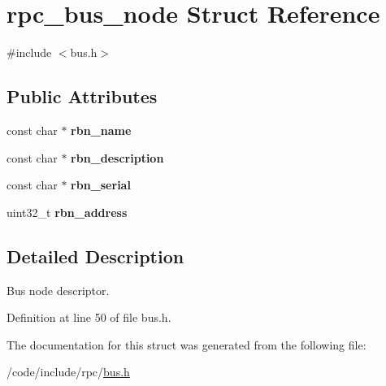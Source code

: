 \hypertarget{structrpc__bus__node}{}\section{rpc\+\_\+bus\+\_\+node Struct Reference}
\label{structrpc__bus__node}


{\ttfamily \#include $<$bus.\+h$>$}

\subsection*{Public Attributes}
\begin{DoxyCompactItemize}
\item 
const char $\ast$ {\bfseries rbn\+\_\+name}\hypertarget{structrpc__bus__node_a7fa4491eff39bb96c779b4208ca388ec}{}\label{structrpc__bus__node_a7fa4491eff39bb96c779b4208ca388ec}

\item 
const char $\ast$ {\bfseries rbn\+\_\+description}\hypertarget{structrpc__bus__node_aa7eab44be63bee011e2b7589a092a3ab}{}\label{structrpc__bus__node_aa7eab44be63bee011e2b7589a092a3ab}

\item 
const char $\ast$ {\bfseries rbn\+\_\+serial}\hypertarget{structrpc__bus__node_a9f5b9214a64d9cd54cd4839f869ba7df}{}\label{structrpc__bus__node_a9f5b9214a64d9cd54cd4839f869ba7df}

\item 
uint32\+\_\+t {\bfseries rbn\+\_\+address}\hypertarget{structrpc__bus__node_a624e2a0be665938924ab2f815afb669e}{}\label{structrpc__bus__node_a624e2a0be665938924ab2f815afb669e}

\end{DoxyCompactItemize}


\subsection{Detailed Description}
Bus node descriptor. 

Definition at line 50 of file bus.\+h.



The documentation for this struct was generated from the following file\+:\begin{DoxyCompactItemize}
\item 
/code/include/rpc/\hyperlink{bus_8h}{bus.\+h}\end{DoxyCompactItemize}
